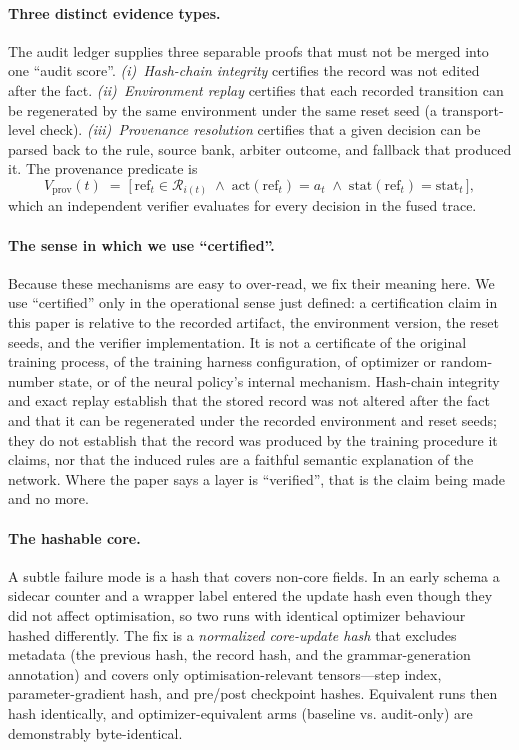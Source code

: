 \documentclass[11pt]{article}
\begin{document}
\paragraph{Three distinct evidence types.}
The audit ledger supplies three separable proofs that must not be merged into one ``audit score''.
\emph{(i)~Hash-chain integrity} certifies the record was not edited after the fact. \emph{(ii)~Environment
replay} certifies that each recorded transition can be regenerated by the same environment under the
same reset seed (a transport-level check). \emph{(iii)~Provenance resolution} certifies that a given
decision can be parsed back to the rule, source bank, arbiter outcome, and fallback that produced it.
The provenance predicate is
\begin{equation}
V_{\mathrm{prov}}(t) \;=\; \big[\,\mathrm{ref}_t \in \mathcal{R}_{i(t)} \;\wedge\;
\mathrm{act}(\mathrm{ref}_t)=a_t \;\wedge\; \mathrm{stat}(\mathrm{ref}_t)=\mathrm{stat}_t\,\big],
\label{eq:vprov}
\end{equation}
which an independent verifier evaluates for every decision in the fused trace.

\paragraph{The sense in which we use ``certified''.}
Because these mechanisms are easy to over-read, we fix their meaning here. We use ``certified'' only in
the operational sense just defined: a certification claim in this paper is relative to the recorded
artifact, the environment version, the reset seeds, and the verifier implementation. It is not a
certificate of the original training process, of the training harness configuration, of optimizer or
random-number state, or of the neural policy's internal mechanism. Hash-chain integrity and exact
replay establish that the stored record was not altered after the fact and that it can be regenerated
under the recorded environment and reset seeds; they do not establish that the record was produced by
the training procedure it claims, nor that the induced rules are a faithful semantic explanation of
the network. Where the paper says a layer is ``verified'', that is the claim being made and no more.

\paragraph{The hashable core.}
A subtle failure mode is a hash that covers non-core fields. In an early schema a sidecar counter and a
wrapper label entered the update hash even though they did not affect optimisation, so two runs with
identical optimizer behaviour hashed differently. The fix is a \emph{normalized core-update hash} that
excludes metadata (the previous hash, the record hash, and the grammar-generation annotation) and
covers only optimisation-relevant tensors---step index, parameter-gradient hash, and pre/post
checkpoint hashes. Equivalent runs then hash identically, and optimizer-equivalent arms (baseline vs.
audit-only) are demonstrably byte-identical.
\end{document}
